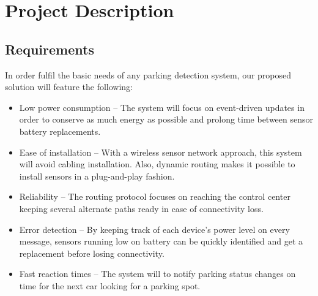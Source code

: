 ﻿\chapter{Project Description}
\label{chap:project_description}

\section{Requirements}
\label{sec:requirements}
\noindent In order fulfil the basic needs of any parking detection system, our proposed solution will feature the following: 
\begin{itemize}[noitemsep]
	\item Low power consumption – The system will focus on event-driven updates in order to conserve as much energy as possible and prolong time between sensor battery replacements.
	\item Ease of installation – With a wireless sensor network approach, this system will avoid cabling installation. Also, dynamic routing makes it possible to install sensors in a plug-and-play fashion.
	\item Reliability – The routing protocol focuses on reaching the control center keeping several alternate paths ready in case of connectivity loss.
	\item Error detection – By keeping track of each device's power level on every message, sensors running low on battery can be quickly identified and get a replacement before losing connectivity.
	\item Fast reaction times – The system will to notify parking status changes on time for the next car looking for a parking spot.
\end{itemize}

